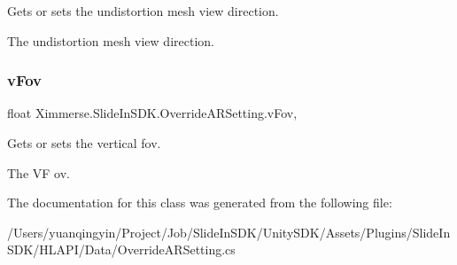 Gets or sets the undistortion mesh view direction. 

The undistortion mesh view direction.\mbox{\label{class_ximmerse_1_1_slide_in_s_d_k_1_1_override_a_r_setting_a74b975635d0934b252363595e9435304}} 
\subsubsection{\texorpdfstring{v\+Fov}{vFov}}
{\footnotesize\ttfamily float Ximmerse.\+Slide\+In\+S\+D\+K.\+Override\+A\+R\+Setting.\+v\+Fov\hspace{0.3cm}{\ttfamily [get]}, {\ttfamily [set]}}



Gets or sets the vertical fov. 

The VF ov.

The documentation for this class was generated from the following file\+:\begin{DoxyCompactItemize}
\item 
/\+Users/yuanqingyin/\+Project/\+Job/\+Slide\+In\+S\+D\+K/\+Unity\+S\+D\+K/\+Assets/\+Plugins/\+Slide\+In\+S\+D\+K/\+H\+L\+A\+P\+I/\+Data/Override\+A\+R\+Setting.\+cs\end{DoxyCompactItemize}
